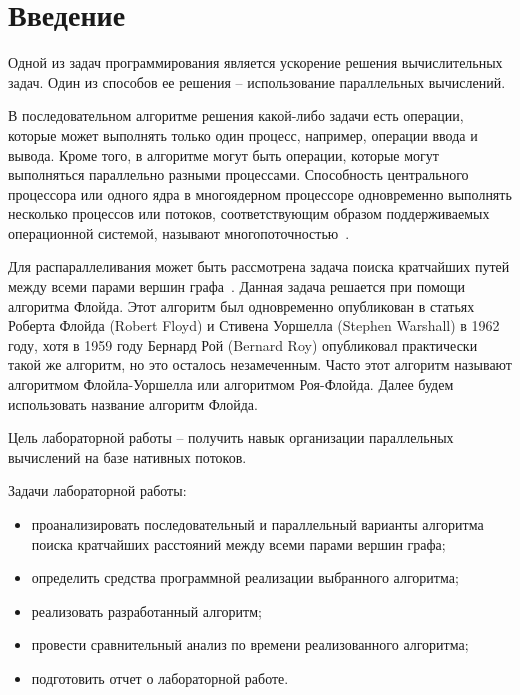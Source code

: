 \chapter*{Введение}


Одной из задач программирования является ускорение решения вычислительных задач. Один из способов ее решения -- использование параллельных вычислений.

В последовательном алгоритме решения какой-либо задачи есть операции, которые может выполнять только один процесс, например, операции ввода и вывода. Кроме того, в алгоритме могут быть операции, которые могут выполняться параллельно разными процессами. Способность центрального процессора или одного ядра в многоядерном процессоре одновременно выполнять несколько процессов или потоков, соответствующим образом поддерживаемых операционной системой, называют многопоточностью~\cite{multithreading}.

Для распараллеливания может быть рассмотрена задача поиска кратчайших путей между всеми парами вершин графа~\cite{diskra}. Данная задача решается при помощи алгоритма Флойда. Этот алгоритм был одновременно опубликован в статьях Роберта Флойда (Robert Floyd) и Стивена Уоршелла (Stephen Warshall) в 1962 году, хотя в 1959 году Бернард Рой (Bernard Roy) опубликовал практически такой же алгоритм, но это осталось незамеченным. Часто этот алгоритм называют алгоритмом Флойла-Уоршелла или алгоритмом Роя-Флойда. Далее будем использовать название алгоритм Флойда.

Цель лабораторной работы -- получить навык организации параллельных вычислений на базе нативных потоков.

Задачи лабораторной работы:
\begin{itemize}[label*=---]
	\item проанализировать последовательный и параллельный варианты алгоритма поиска кратчайших расстояний между всеми парами вершин графа;
	\item определить средства программной реализации выбранного алгоритма;
	\item реализовать разработанный алгоритм;
	\item провести сравнительный анализ по времени реализованного алгоритма;
	\item подготовить отчет о лабораторной работе.
\end{itemize}


